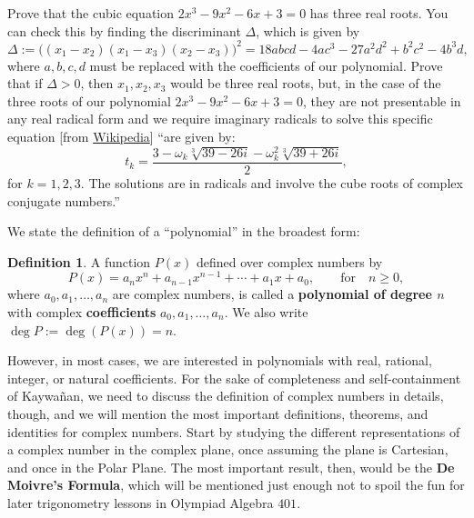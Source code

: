\documentclass[12pt,a4paper]{memoir}
\theoremstyle{definition}
\newtheorem*{definition}{Definition}
\begin{document}
	\begin{example}
		Prove that the cubic equation $2x^{3}-9x^{2}-6x+3=0$ has three real roots. You can check this by finding the discriminant $\Delta$, which is given by \[\Delta:={\bigl (}(x_{1}-x_{2})(x_{1}-x_{3})(x_{2}-x_{3}){\bigr )}^{2}=18abcd-4ac^{3}-27a^{2}d^{2}+b^{2}c^{2}-4b^{3}d,\]
		where $a,b,c,d$ must be replaced with the coefficients of our polynomial. Prove that if $\Delta>0$,  then $x_1,x_2,x_3$ would be three real roots, but, in the case of the three roots of our polynomial $2x^{3}-9x^{2}-6x+3=0$, they are not presentable in any real radical form and we require imaginary radicals to solve this specific equation [from \href{https://en.wikipedia.org/wiki/Casus_irreducibilis}{Wikipedia}] ``are given by: 
		\[{\displaystyle t_{k}={\frac {3-\omega _{k}{\sqrt[{3}]{39-26i}}-\omega _{k}^{2}{\sqrt[{3}]{39+26i}}}{2}}},\]
		for $k=1,2,3$. The solutions are in radicals and involve the cube roots of complex conjugate numbers.''
	\end{example}


\begin{tcolorbox}[title={Definition of Polynomial and Roots}]
	We state the definition of a ``polynomial'' in the broadest form:
	\begin{definition}
		A function $P(x)$ defined over complex numbers by
		\[P(x)=a_nx^n+a_{n-1}x^{n-1}+\cdots+a_1x+a_0, \qquad \text{for} \quad n \geq 0,\]
		where $a_0,a_1,\dots,a_n$ are complex numbers, is called a \textbf{polynomial of degree $n$} with complex \textbf{coefficients} $a_0,a_1,\dots,a_n$. We also write $\deg P := \deg(P(x)) = n$.
	\end{definition}
\end{tcolorbox}

However, in most cases, we are interested in polynomials with real, rational, integer, or natural coefficients. For the sake of completeness and self-containment of Kaywañan, we need to discuss the definition of complex numbers in details, though, and we will mention the most important definitions, theorems, and identities for complex numbers. Start by studying the different representations of a complex number in the complex plane, once assuming the plane is Cartesian, and once in the Polar Plane. The most important result, then, would be the \textbf{De Moivre's Formula}, which will be mentioned just enough not to spoil the fun for later trigonometry lessons in Olympiad Algebra $401$.
\end{document}
